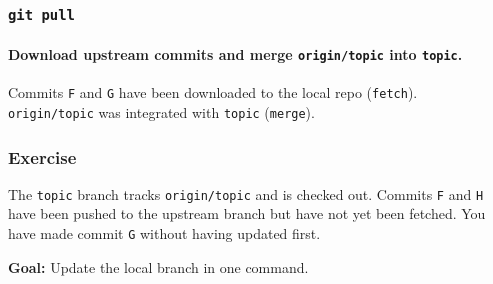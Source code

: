 \documentclass{beamer}
\newcommand\gitcmd[1]{\texttt{git #1}}
\newcommand\gitsubcmd[1]{\texttt{#1}}
\newcommand\grefspec[1]{\texttt{#1}}
\newcommand\gbranch[1]{\texttt{#1}}
\newcommand\gremotebranch[1]{\texttt{#1}}
\newcommand\goal[1]{\textbf{Goal:} #1}
\begin{document}
\begin{frame}
  \frametitle{\gitcmd{pull}}
  \framesubtitle{Download upstream commits and merge \gremotebranch{origin/topic} into \gbranch{topic}.}
  \begin{figure}
    \centering
  \end{figure}

  Commits \grefspec{F} and \grefspec{G} have been downloaded to the local repo (\gitsubcmd{fetch}).\\
  \gremotebranch{origin/topic} was integrated with \gbranch{topic} (\gitsubcmd{merge}).
\end{frame}

\begin{frame}
  \frametitle{Exercise}
  The \gbranch{topic} branch tracks \gremotebranch{origin/topic} and is checked out. Commits \grefspec{F} and \grefspec{H} have been pushed to the upstream branch but have not yet been fetched. You have made commit \grefspec{G} without having updated first.

  \goal{Update the local branch in one command.}

  \begin{figure}
    \centering
  \end{figure}
\end{frame}
\end{document}
